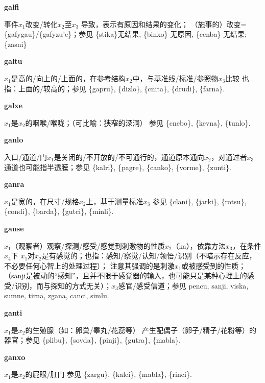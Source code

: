 \documentclass[notitlepage,twocolumn,a4paper,10pt]{book}
\begin{document}
{{\sffamily\bfseries galfi}\enspace {\ttfamily\bfseries[gaf     ga'i]}  事件$x_1$改变\slash{}转化$x_2$至$x_3$ \textemdash{} 导致，表示有原因和结果的变化； （施事的）改变= \{gafygau\}\slash{}\{gafyzu'e\}；参见 \{stika\}无结果, \{binxo\} 无原因, \{cenba\} 无结果; \{zasni\}

{\sffamily\bfseries galtu}\enspace {\ttfamily\bfseries[gal     ga'u]}  $x_1$是高的\slash{}向上的\slash{}上面的，在参考结构$x_2$中，与基准线\slash{}标准\slash{}参照物$x_3$比较 \textemdash{} 也指：上面的\slash{}较高的；参见 \{gapru\}, \{dizlo\}, \{cnita\}, \{drudi\}, \{farna\}.

{\sffamily\bfseries galxe} $x_1$是$x_2$的咽喉\slash{}喉咙；（可比喻：狭窄的深洞） \textemdash{} 参见 \{cnebo\}, \{kevna\}, \{tunlo\}.

{\sffamily\bfseries ganlo}\enspace {\ttfamily\bfseries[        ga'o]}  入口\slash{}通道\slash{}门$x_1$是关闭的\slash{}不开放的\slash{}不可通行的，通道原本通向$x_2$，对通过者$x_3$ \textemdash{} 通道也可能指半透膜；参见 \{kalri\}, \{pagre\}, \{canko\}, \{vorme\}, \{zunti\}.

{\sffamily\bfseries ganra}\enspace {\ttfamily\bfseries[gan]}  $x_1$是宽的，在尺寸\slash{}规格$x_2$上，基于测量标准$x_3$ \textemdash{} 参见 \{clani\}, \{jarki\}, \{rotsu\}, \{condi\}, \{barda\}, \{gutci\}, \{minli\}.

{\sffamily\bfseries ganse}\enspace {\ttfamily\bfseries[gas     ga'e]}  $x_1$（观察者）观察\slash{}探测\slash{}感受\slash{}感觉到刺激物的性质$x_2$（ka），依靠方法$x_3$，在条件$x_4$下 \textemdash{} $x_1$对$x_2$是有感觉的；也指：感知\slash{}察觉\slash{}认知\slash{}领悟\slash{}识别（不暗示存在反应，不必要任何心智上的处理过程）； 注意其强调的是刺激$x_1$或被感受到的性质；（{sanji}是被动的“感知”，且并不限于感觉器的输入，也可能只是某种心理上的感受\slash{}识别，而与探知的方式无关）；$x_3$感官\slash{}感受信道；参见 {pencu}, {sanji}, {viska}, {sumne}, {tirna}, {zgana}, {canci}, {simlu}.

{\sffamily\bfseries ganti} $x_1$是$x_2$的生殖腺（如：卵巢\slash{}睾丸\slash{}花蕊等） \textemdash{} 产生配偶子（卵子\slash{}精子\slash{}花粉等）的器官；参见 \{plibu\}, \{sovda\}, \{pinji\}, \{gutra\}, \{mabla\}.

{\sffamily\bfseries ganxo}\enspace {\ttfamily\bfseries[gax]}  $x_1$是$x_2$的屁眼\slash{}肛门 \textemdash{} 参见 \{zargu\}, \{kalci\}, \{mabla\}, \{rinci\}.

}
\end{document}

